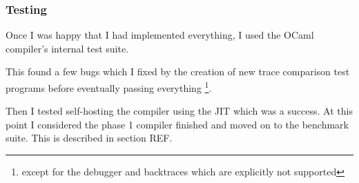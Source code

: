 \subsubsection{Testing}

Once I was happy that I had implemented everything, I used the OCaml compiler's internal test
suite.

This found a few bugs which I fixed by the creation of new trace comparison test programs before
eventually passing
everything \footnote{except for the debugger and backtraces which are explicitly not supported}.

Then I tested self-hosting the compiler using the JIT which was a success. At this point I
considered the phase 1 compiler finished and moved on to the benchmark suite. This is described in
section REF.
